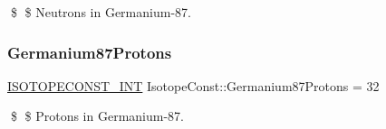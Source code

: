 \$ \$ Neutrons in Germanium-\/87. \mbox{\label{group___isotope_const-_germanium-_ge87_gab9e25917a67a855423d788367a3442b4}} 
\subsubsection{\texorpdfstring{Germanium87\+Protons}{Germanium87Protons}}
{\footnotesize\ttfamily \mbox{\hyperlink{group___isotope_const-_macros_ga5f18360b3e99483a35c32d789e62621c}{I\+S\+O\+T\+O\+P\+E\+C\+O\+N\+S\+T\+\_\+\+I\+NT}} Isotope\+Const\+::\+Germanium87\+Protons = 32}

\$ \$ Protons in Germanium-\/87. 